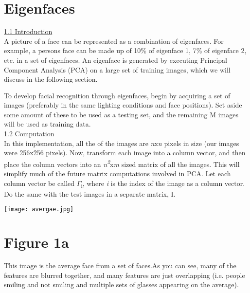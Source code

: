 \documentclass{tufte-handout}
\begin{document}
\section{Eigenfaces}
\underline{1.1 Introduction}
\\

A picture of a face can be represented as a combination of eigenfaces. For example, a person\textsc{}s face can be made up of 10\% of eigenface 1, 7\% of eigenface 2, etc. in a set of eigenfaces. An eigenface is generated by executing Principal Component Analysis (PCA) on a large set of training images, which we will discuss in the following section. 

To develop facial recognition through eigenfaces, begin by acquiring a set of images (preferably in the same lighting conditions and face positions). Set aside some amount of these to be used as a testing set, and the remaining M images will be used as training data. \\ 
\vspace{5mm} \noindent \underline{1.2 Computation}\\
In this implementation, all the of the images are \textit{n}x\textit{n} pixels in size (our images were 256x256 pixels). Now, transform each image into a column vector, and then place the column vectors into an \textit{n\textsuperscript{2}}x\textit{m} sized matrix of all the images. This will simplify much of the future matrix computations involved in PCA. Let each column vector be called $\Gamma$\textsubscript{i}, where \textit{i} is the index of the image as a column vector. Do the same with the test images in a separate matrix, I.\\

\begin{marginfigure}
\texttt{[image: avergae.jpg]}
\section{Figure 1a}
This image is the average face from a set of faces.As you can see, many of the features are blurred together, and many features are just overlapping (i.e. people smiling and not smiling and multiple sets of glasses appearing on the average).

\end{marginfigure}
\end{document}
